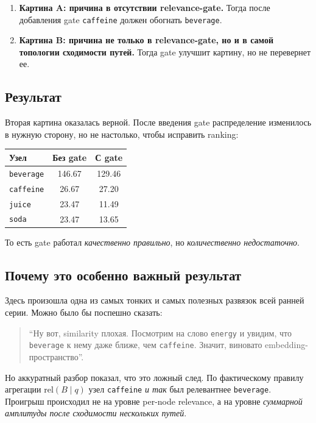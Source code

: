\begin{enumerate}[leftmargin=2em]
\item \textbf{Картина A: причина в отсутствии relevance-gate.}
Тогда после добавления gate \texttt{caffeine} должен обогнать
\texttt{beverage}.
\item \textbf{Картина B: причина не только в relevance-gate, но и в самой
топологии сходимости путей.} Тогда gate улучшит картину, но не перевернет ее.
\end{enumerate}

\subsection{Результат}

Вторая картина оказалась верной. После введения gate распределение изменилось в
нужную сторону, но не настолько, чтобы исправить ranking:

\begin{center}
\begin{tabular}{lcc}
\toprule
Узел & Без gate & С gate \\
\midrule
\texttt{beverage} & 146.67 & 129.46 \\
\texttt{caffeine} & 26.67 & 27.20 \\
\texttt{juice} & 23.47 & 11.49 \\
\texttt{soda} & 23.47 & 13.65 \\
\bottomrule
\end{tabular}
\end{center}

То есть gate работал \emph{качественно правильно}, но \emph{количественно
недостаточно}.

\subsection{Почему это особенно важный результат}

Здесь произошла одна из самых тонких и самых полезных развязок всей ранней
серии. Можно было бы поспешно сказать:

\begin{quote}
``Ну вот, similarity плохая. Посмотрим на слово \texttt{energy} и увидим, что
\texttt{beverage} к нему даже ближе, чем \texttt{caffeine}. Значит, виновато
embedding-пространство''.
\end{quote}

Но аккуратный разбор показал, что это ложный след. По фактическому правилу
агрегации $\mathrm{rel}(B\mid q)$ узел \texttt{caffeine} \emph{и так} был
релевантнее \texttt{beverage}. Проигрыш происходил не на уровне per-node
relevance, а на уровне \emph{суммарной амплитуды после сходимости нескольких
путей}.

